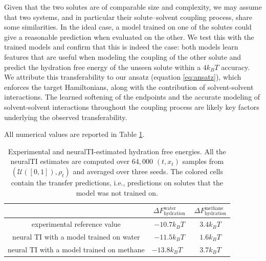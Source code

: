 \documentclass[%
onecolumn,
superscriptaddress,
nofootinbib,
amsmath,amssymb,
table
]{revtex4-2}
\begin{document}
Given that the two solutes are of comparable size and complexity, we may assume that two systems, and in particular their solute--solvent coupling process, share some similarities. In the ideal case, a model trained on one of the solutes could give a reasonable prediction when evaluated on the other. We test this with the trained models and confirm that this is indeed the case: both models learn features that are useful when modeling the coupling of the other solute and predict the hydration free energy of the unseen solute within a $4k_BT$ accuracy. 
We attribute this transferability to our ansatz (equation \ref{eq:ansatz}), which enforces the target Hamiltonians, along with the contribution of solvent-solvent interactions. The learned softening of the endpoints and the accurate modeling of solvent-solvent interactions throughout the coupling process are likely key factors underlying the observed transferability.


All numerical values are reported in Table \ref{tab:results}.
\begin{table}[h]
\centering
\renewcommand{\arraystretch}{1.5}
\caption{Experimental and neuralTI-estimated hydration free energies. All the neuralTI estimates are computed over $64,000$ $(t,x_t)$ samples from $(\mathcal U([0,1]),\rho_t)$ and averaged over three seeds. The colored cells contain the transfer predictions, i.e., predictions on solutes that the model was not trained on.}
\label{tab:results}
\begin{tabular}{ccc}
\toprule
 \textbf{} & $\Delta F_{\text{hydration}}^{\text{water}}$  & $\Delta F_{\text{hydration}}^{\text{methane}}$ \\ \midrule
experimental reference value & $-10.7 k_BT$  & $3.4 k_BT$  \\ 
neural TI with a model trained on water & $-11.5 k_BT$  &  \cellcolor{red!20}  $1.6 k_BT$  \\
neural TI with a model trained on methane &  \cellcolor{red!20} $-13.8 k_BT\,\,\,\,$  & $3.7 k_BT$  \\
\bottomrule
\end{tabular}

\end{table}
\end{document}
